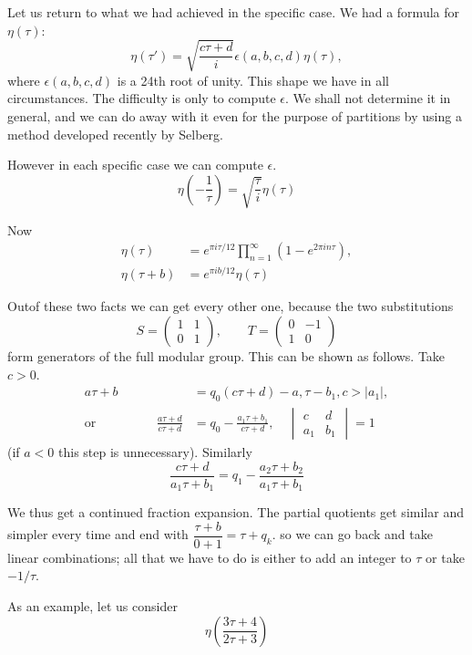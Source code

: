 Let us return to what we had achieved in the specific case. We had a
formula for $\eta (\tau)$:
$$
\eta(\tau') = \sqrt{\frac{c \tau+d}{i}} \epsilon(a, b, c, d) \eta (\tau),
$$
where $\epsilon (a, b, c, d)$ is a 24th root of unity. This shape we have
in all circumstances. The difficulty is only to compute $\epsilon$. We
shall not determine it in general, and we can do away with it even for
the purpose of partitions by using a method developed recently by
Selberg. 

However in each specific case we can compute $\epsilon$.
$$
\eta \left( - \frac{1}{\tau}\right)= \sqrt{\frac{\tau}{i}} \eta (\tau)  
$$

Now  
\begin{align*}
  \eta (\tau) & = e^{\pi i \tau/12} \prod^{\infty}_{n=1} (1- e^{2 \pi
    i n \tau}),\\
  \eta (\tau + b) & = e^{\pi i b/12} \eta(\tau)
\end{align*}

Out\pageoriginale of these two facts we can get every other one,
because the two substitutions
$$
S= \begin{pmatrix} 1 & 1\\  0 & 1 \end{pmatrix}, \qquad 
T= \begin{pmatrix} 0 & -1\\ 1 & 0 \end{pmatrix}
$$
form generators of the full modular group. This can be shown as
follows. Take $c> 0$.
\begin{align*}
  a \tau + b & = q_0 (c \tau +d)- a, \tau - b_1, c > |a_1|,\\
  \text{or} \hspace{2cm} \frac{a \tau +d}{c \tau +d} & = q_0 -
  \frac{a_1 \tau + b_1}{c \tau +d}, \quad 
  \begin{vmatrix} c & d\\ a_1 & b_1 \end{vmatrix} =1
\end{align*}
(if $a<0$ this step is unnecessary). Similarly
$$
\frac{c \tau +d}{a_1 \tau + b_1}= q_1 - \frac{a_2 \tau + b_2}{a_1 \tau
  + b_1} 
$$

We thus get a continued fraction expansion. The partial quotients get
similar and simpler every time and end with $\dfrac{\tau +b}{0 +1} =
\tau + q_k$. so we can go back and take linear combinations; all that
we have to do is either to add an integer to $\tau$ or take $-
1/\tau$. 

As an example, let us consider
$$
\eta \left(\frac{3 \tau+4}{2 \tau+3} \right)
$$


